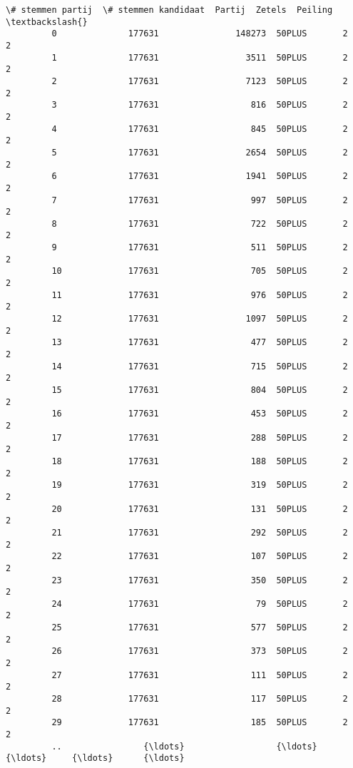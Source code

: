 \documentclass{article}
\begin{document}
\begin{Verbatim}[commandchars=\\\{\}]
              \# stemmen partij  \# stemmen kandidaat  Partij  Zetels  Peiling  \textbackslash{}
         0              177631               148273  50PLUS       2        2   
         1              177631                 3511  50PLUS       2        2   
         2              177631                 7123  50PLUS       2        2   
         3              177631                  816  50PLUS       2        2   
         4              177631                  845  50PLUS       2        2   
         5              177631                 2654  50PLUS       2        2   
         6              177631                 1941  50PLUS       2        2   
         7              177631                  997  50PLUS       2        2   
         8              177631                  722  50PLUS       2        2   
         9              177631                  511  50PLUS       2        2   
         10             177631                  705  50PLUS       2        2   
         11             177631                  976  50PLUS       2        2   
         12             177631                 1097  50PLUS       2        2   
         13             177631                  477  50PLUS       2        2   
         14             177631                  715  50PLUS       2        2   
         15             177631                  804  50PLUS       2        2   
         16             177631                  453  50PLUS       2        2   
         17             177631                  288  50PLUS       2        2   
         18             177631                  188  50PLUS       2        2   
         19             177631                  319  50PLUS       2        2   
         20             177631                  131  50PLUS       2        2   
         21             177631                  292  50PLUS       2        2   
         22             177631                  107  50PLUS       2        2   
         23             177631                  350  50PLUS       2        2   
         24             177631                   79  50PLUS       2        2   
         25             177631                  577  50PLUS       2        2   
         26             177631                  373  50PLUS       2        2   
         27             177631                  111  50PLUS       2        2   
         28             177631                  117  50PLUS       2        2   
         29             177631                  185  50PLUS       2        2   
         ..                {\ldots}                  {\ldots}     {\ldots}     {\ldots}      {\ldots}   

\end{Verbatim}
\end{document}
